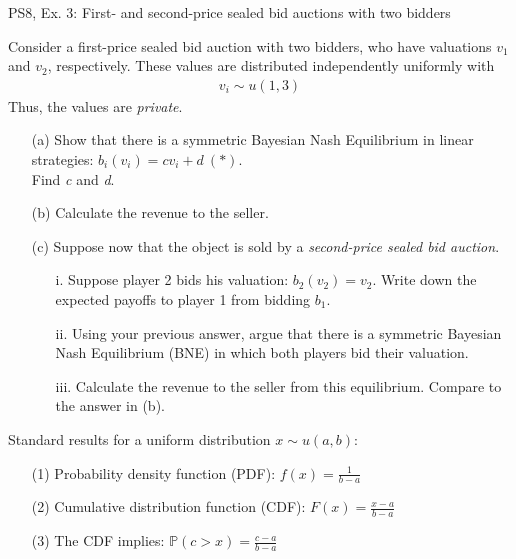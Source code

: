\begin{frame}{PS8, Ex. 3: First- and second-price sealed bid auctions with two bidders}
    \begin{multicols}{2}
      Consider a first-price sealed bid auction with two bidders, who have valuations $v_1$ and $v_2$, respectively. These values are distributed independently uniformly with
      \begin{align*}
        v_i\sim u(1,3)
      \end{align*}
      Thus, the values are \textit{private}.
      \begin{itemize}
        \item[(a)] Show that there is a symmetric Bayesian Nash Equilibrium in linear strategies: $b_i(v_i) = cv_i + d\ (*)$.\\
                   Find \textit{c} and \textit{d}.
        \item[(b)] Calculate the revenue to the seller.
      \end{itemize}
      \vfill\null\columnbreak
      \begin{itemize}
        \item[(c)] Suppose now that the object is sold by a \textit{second-price sealed bid auction}.
        \begin{itemize}\normalsize
          \item[i.]   Suppose player 2 bids his valuation: $b_2(v_2) = v_2$. Write down the expected payoffs to player 1 from bidding $b_1$.
          \item[ii.]  Using your previous answer, argue that there is a symmetric Bayesian Nash Equilibrium (BNE) in which both players bid their valuation.
          \item[iii.] Calculate the revenue to the seller from this equilibrium. Compare to the answer in (b).
        \end{itemize}
      \end{itemize}
      \vfill\null
    \end{multicols}
    \vspace{-8pt}
    Standard results for a uniform distribution $x\sim u(a, b):$
    \begin{enumerate}
      \item[(1)] Probability density function (PDF): $f(x)=\frac{1}{b-a}$
      \item[(2)] Cumulative distribution function (CDF): $F(x)=\frac{x-a}{b-a}$
      \item[(3)] The CDF implies: $\mathbb{P}(c>x)=\frac{c-a}{b-a}$
    \end{enumerate}
    \vfill\null
\end{frame}


